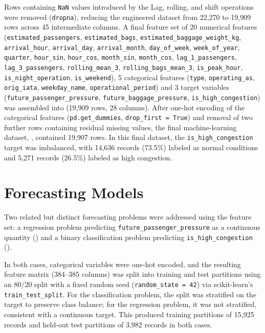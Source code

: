 Rows containing \texttt{NaN} values introduced by the Lag, rolling, and shift operations were removed (\texttt{dropna}), reducing the engineered dataset from 22,270 to 19,909 rows across 45 intermediate columns. A final feature set of 20 numerical features (\nolinkurl{estimated_passengers}, \nolinkurl{estimated_bags}, \nolinkurl{estimated_baggage_weight_kg}, \nolinkurl{arrival_hour}, \nolinkurl{arrival_day}, \nolinkurl{arrival_month}, \nolinkurl{day_of_week}, \nolinkurl{week_of_year}, \nolinkurl{quarter}, \nolinkurl{hour_sin}, \nolinkurl{hour_cos}, \nolinkurl{month_sin}, \nolinkurl{month_cos}, \nolinkurl{lag_1_passengers}, \nolinkurl{lag_3_passengers}, \nolinkurl{rolling_mean_3}, \nolinkurl{rolling_bags_mean_3}, \nolinkurl{is_peak_hour}, \nolinkurl{is_night_operation}, \nolinkurl{is_weekend}), 5 categorical features (\nolinkurl{type}, \nolinkurl{operating_as}, \nolinkurl{orig_iata}, \nolinkurl{weekday_name}, \nolinkurl{operational_period}) and 3 target variables (\nolinkurl{future_passenger_pressure}, \nolinkurl{future_baggage_pressure}, \nolinkurl{is_high_congestion}) was assembled into  (19,909 rows, 28 columns). After one-hot encoding of the categorical features (\texttt{pd.get\_dummies}, \texttt{drop\_first = True}) and removal of two further rows containing residual missing values, the final machine-learning dataset, , contained 19,907 rows. In this final dataset, the \nolinkurl{is_high_congestion} target was imbalanced, with 14,636 records (73.5\%) labeled as normal conditions and 5,271 records (26.5\%) labeled as high congestion.

\section{Forecasting Models}
\label{sec:forecasting-models}

Two related but distinct forecasting problems were addressed using the
 feature set: a regression problem predicting
\nolinkurl{future_passenger_pressure} as a continuous quantity
()
and a binary classification problem predicting
\nolinkurl{is_high_congestion}
().

In both cases, categorical variables were one-hot encoded, and the resulting
feature matrix (384--385 columns) was split into training and test partitions
using an 80/20 split with a fixed random seed
(\texttt{random\_state = 42}) via scikit-learn's
\texttt{train\_test\_split}. For the classification problem, the split was
stratified on the target to preserve class balance; for the regression
problem, it was not stratified, consistent with a continuous target.
This produced training partitions of 15,925 records and held-out test
partitions of 3,982 records in both cases.

